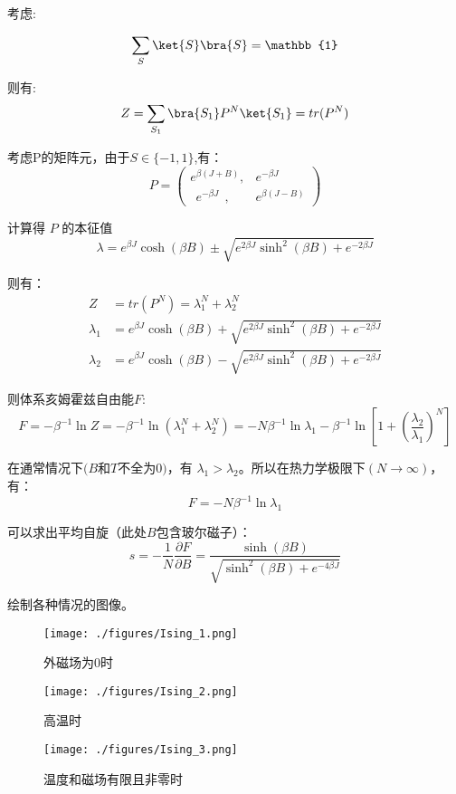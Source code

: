 考虑:

\begin{equation}
\sum_S\ket{S}\bra{S}=\mathbb{1}
\end{equation}

则有:
\begin{equation}
Z=\sum\limits_{S_1}\bra{S_1}P^N\ket{S_1}=tr(P^N)
\end{equation}

考虑P的矩阵元，由于$S\in\{-1,1\}$,有：
$$P=\begin{pmatrix}
e^{\beta(J+B)},&e^{-\beta J} \\
~~e^{-\beta J}~~, & e^{\beta(J-B)}
\end{pmatrix}$$

计算得 $P$ 的本征值
$$\lambda=e^{\beta J}\cosh{(\beta B)}\pm \sqrt{e^{2\beta J }\sinh^2{(\beta B)}+e^{-2\beta J }}$$

则有：
\begin{align}
Z&=tr(P^N)=\lambda_1^N+\lambda_2^N \\
\lambda_1&=e^{\beta J}\cosh{(\beta B)}+ \sqrt{e^{2\beta J }\sinh^2{(\beta B)}+e^{-2\beta J }} \\
\lambda_2&=e^{\beta J}\cosh{(\beta B)}- \sqrt{e^{2\beta J }\sinh^2{(\beta B)}+e^{-2\beta J }}
\end{align}

则体系亥姆霍兹自由能$F$:
$$F=-\beta^{-1}\ln{Z}=-\beta^{-1}\ln{(\lambda_1^N+\lambda_2^N)}=-N\beta^{-1}\ln{\lambda_1}-\beta^{-1}\ln[1+(\frac{\lambda_2}{\lambda_1})^N]$$

在通常情况下$(B$和$T$不全为$0)$，有 $\lambda_1>\lambda_2$。所以在热力学极限下$(N\rightarrow\infty)$，有：
$$F=-N\beta^{-1}\ln{\lambda_1}$$

可以求出平均自旋（此处$B$包含玻尔磁子）：
$$s=-\frac{1}{N}\frac{\partial F}{\partial B}=\frac{\sinh(\beta B)}{\sqrt{\sinh^2(\beta B)+e^{-4\beta J}}}$$

绘制各种情况的图像。

\begin{figure}[ht]
\centering
\texttt{[image: ./figures/Ising\_1.png]}
\caption{外磁场为0时} \label{Ising_fig1}
\end{figure}

\begin{figure}[ht]
\centering
\texttt{[image: ./figures/Ising\_2.png]}
\caption{高温时} \label{Ising_fig2}
\end{figure}

\begin{figure}[ht]
\centering
\texttt{[image: ./figures/Ising\_3.png]}
\caption{温度和磁场有限且非零时} \label{Ising_fig3}
\end{figure}

